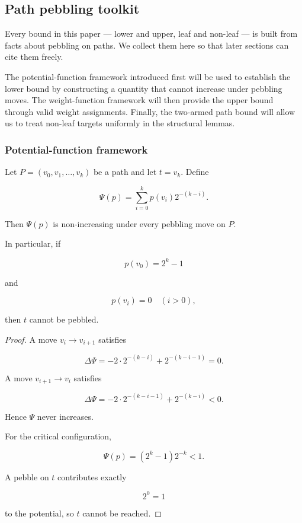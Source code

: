 

\subsection{Path pebbling toolkit}
\label{sec:toolkit}


Every bound in this paper --- lower and upper, leaf and non-leaf --- is built
from facts about pebbling on paths. We collect them here so that later
sections can cite them freely.

The potential-function framework introduced first will be used to establish
the lower bound by constructing a quantity that cannot increase under
pebbling moves. The weight-function framework will then provide the upper
bound through valid weight assignments. Finally, the two-armed path bound will
allow us to treat non-leaf targets uniformly in the structural lemmas.


\subsubsection{Potential-function framework}


\begin{lemma}
\label{lem:path-lb}

Let $P=(v_0,v_1,\ldots,v_k)$ be a path and let $t=v_k$.
Define

\[
\Psi(p)=\sum_{i=0}^{k}p(v_i)2^{-(k-i)}.
\]

Then $\Psi(p)$ is non-increasing under every pebbling move on $P$.

In particular, if

\[
p(v_0)=2^k-1
\]

and

\[
p(v_i)=0\quad(i>0),
\]

then $t$ cannot be pebbled.

\end{lemma}


\begin{proof}

A move $v_i\to v_{i+1}$ satisfies

\[
\Delta\Psi
=
-2\cdot2^{-(k-i)}
+
2^{-(k-i-1)}
=0 .
\]

A move $v_{i+1}\to v_i$ satisfies

\[
\Delta\Psi
=
-2\cdot2^{-(k-i-1)}
+
2^{-(k-i)}
<0 .
\]

Hence $\Psi$ never increases.

For the critical configuration,

\[
\Psi(p)
=
(2^k-1)2^{-k}
<1 .
\]

A pebble on $t$ contributes exactly

\[
2^0=1
\]

to the potential, so $t$ cannot be reached.

\end{proof}



